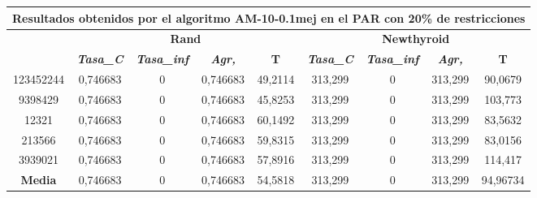 \documentclass[12pt, spanish]{article}
\begin{document}
\begin{table}[H]
\footnotesize
\begin{tabular}{|c|c|c|c|c|c|c|c|c|}
\hline
\multicolumn{9}{|c|}{\textbf{Resultados obtenidos por el algoritmo AM-10-0.1mej en el PAR con 20\% de restricciones}}                                                                                             \\ \hline
\multirow{2}{*}{} & \multicolumn{4}{c|}{\textbf{Rand}}                                                            & \multicolumn{4}{c|}{\textbf{Newthyroid}}                                                      \\ \cline{2-9} 
                  & \textit{\textbf{Tasa\_C}} & \textit{\textbf{Tasa\_inf}} & \textit{\textbf{Agr,}} & \textbf{T} & \textit{\textbf{Tasa\_C}} & \textit{\textbf{Tasa\_inf}} & \textit{\textbf{Agr,}} & \textbf{T} \\ \hline
123452244         & 0,746683                  & 0                           & 0,746683               & 49,2114    & 313,299                   & 0                           & 313,299                & 90,0679    \\ \hline
9398429           & 0,746683                  & 0                           & 0,746683               & 45,8253    & 313,299                   & 0                           & 313,299                & 103,773    \\ \hline
12321             & 0,746683                  & 0                           & 0,746683               & 60,1492    & 313,299                   & 0                           & 313,299                & 83,5632    \\ \hline
213566            & 0,746683                  & 0                           & 0,746683               & 59,8315    & 313,299                   & 0                           & 313,299                & 83,0156    \\ \hline
3939021           & 0,746683                  & 0                           & 0,746683               & 57,8916    & 313,299                   & 0                           & 313,299                & 114,417    \\ \hline
\textbf{Media}    & 0,746683                  & 0                           & 0,746683               & 54,5818    & 313,299                   & 0                           & 313,299                & 94,96734   \\ \hline
\end{tabular}
\end{table}
\end{document}
